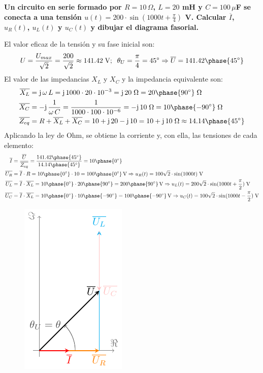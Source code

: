 	\vspace{4mm}
	\begin{example}\label{ej.2-3}
		\textbf{Un circuito en serie formado por $R=10\,\Omega$, $L=20$ mH y $C=100\,\mu$F se conecta a una tensión $u(t)=200\cdot\sin(1000t+\frac{\pi}{4})$ V. Calcular $\overline{I}$, ${u_R(t)}$, $u_L(t)$ y $u_C(t)$ y dibujar el diagrama fasorial.}
		
		El valor eficaz de la tensión y su fase inicial son:
		\begin{equation*}
			U=\dfrac{U_{max}}{\sqrt{2}}=\dfrac{200}{\sqrt{2}}\approx 141.42\;\text{V};\;\;\theta_U=\dfrac{\pi}{4}=45^\circ \Rightarrow \overline{U}=141.42\phase{45^\circ}
		\end{equation*}
		El valor de las impedancias $X_L$ y $X_C$ y la impedancia equivalente son:
		\begin{align*}
			\overline{X_L}&=\mathrm{j}\,\omega\,L=\mathrm{j}\,1000\cdot20\cdot 10^{-3}= \mathrm{j}\,20\;\Omega=20\phase{90^\circ}\;\Omega\\
			\overline{X_C}&=-\mathrm{j}\,\dfrac{1}{\omega\,C}=\dfrac{1}{1000\cdot100\cdot 10^{-6}}= -\mathrm{j}\,10\;\Omega=10\phase{-90^\circ}\;\Omega		\\
			\overline{Z_{eq}}&=R+\overline{X_L}+\overline{X_C}=10+\mathrm{j}\,20-\mathrm{j}\,10=10+\mathrm{j}\,10\;\Omega\approx 14.14\phase{45^\circ}
		\end{align*}
		Aplicando la ley de Ohm, se obtiene la corriente y, con ella, las tensiones de cada elemento:
		\begin{align*}
			\overline{I}&=\dfrac{\overline{U}}{\overline{Z_{eq}}}=\dfrac{141.42\phase{45^\circ}}{14.14\phase{45^\circ}}=10\phase{0^\circ}\\
			\overline{U_R}&=\overline{I}\cdot R=10\phase{0^\circ}\cdot 10=100\phase{0^\circ}\,\text{V}\Rightarrow u_R(t)=100\sqrt{2}\cdot\sin(1000t)\;\text{V}\\
			\overline{U_L}&=\overline{I}\cdot \overline{X_L}=10\phase{0^\circ}\cdot 20\phase{90^\circ}=200\phase{90^\circ}\,\text{V}\Rightarrow u_L(t)=200\sqrt{2}\cdot\sin(1000t+\frac{\pi}{2})\;\text{V}\\
			\overline{U_C}&=\overline{I}\cdot \overline{X_L}=10\phase{0^\circ}\cdot 10\phase{-90^\circ} =100\phase{-90^\circ}\,\text{V}\Rightarrow u_C(t)=100\sqrt{2}\cdot\sin(1000t-\frac{\pi}{2})\;\text{V}
		\end{align*}
		\begin{figure}[H]
			\centering
			\includegraphics[]{../figs/diagrama_fasorial_ejemplo2_3.pdf}

\end{figure}
\end{example}
